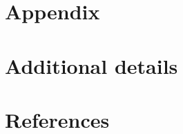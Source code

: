 \documentclass[
]{article}
\begin{document}
\newpage

\appendix

\hypertarget{appendix}{%
\section*{Appendix}\label{appendix}}

\hypertarget{additional-details}{%
\section{Additional details}\label{additional-details}}

\newpage

\hypertarget{references}{%
\section{References}\label{references}}
\end{document}
